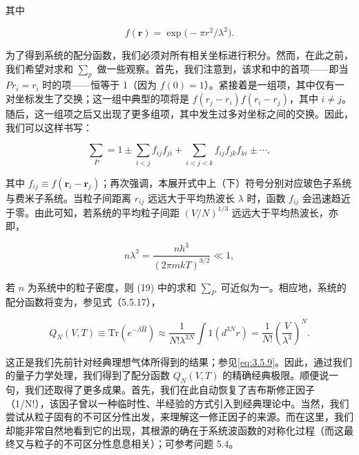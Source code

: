 其中

\begin{equation}\tag{5.4.37}\label{eq:5.4.37}
f ( \boldsymbol { r } ) = \exp \big ( - \pi r ^{2} / \lambda ^{2} \big ) .
\end{equation}

为了得到系统的配分函数，我们必须对所有相关坐标进行积分。然而，在此之前，我们希望对求和 \(\sum_{p}\) 做一些观察。首先，我们注意到，该求和中的首项------即当 \(Pr_{i}=r_{i}\) 时的项------恒等于 1（因为 \(f(0)=1\)）。紧接着是一组项，其中仅有一对坐标发生了交换；这一组中典型的项将是 \(f(r_{j}-r_{i})f(r_{i}-r_{j})\)，其中 \(i\neq j\)。随后，这一组项之后又出现了更多组项，其中发生过多对坐标之间的交换。因此，我们可以这样书写：

\begin{equation}\tag{5.4.38}\label{eq:5.4.38}
\sum _ { P } = 1 \pm \sum _ { i < j } f _ { i j } f _ { j i } + \sum _ { i < j < k } f _ { i j } f _ { j k } f _ { k i } \pm \cdots ,
\end{equation}

其中 \(f_{ij} \equiv f(\boldsymbol{r}_i - \boldsymbol{r}_j)\)；再次强调，本展开式中上（下）符号分别对应玻色子系统与费米子系统。当粒子间距离 \(r_{ij}\) 远远大于平均热波长 \(\lambda\) 时，函数 \(f_{ij}\) 会迅速趋近于零。由此可知，若系统的平均粒子间距 \((V/N)^{1/3}\) 远远大于平均热波长，亦即，

\begin{equation}\tag{5.4.39}\label{eq:5.4.39}
n \lambda ^{3} = \frac { n h ^{3} } { ( 2 \pi m k T ) ^{3 / 2} } \ll 1 ,
\end{equation}

若 \(n\) 为系统中的粒子密度，则 (19) 中的求和 \(\sum_{P}\) 可近似为一。相应地，系统的配分函数将变为，参见式（5.5.17），

\begin{equation}\tag{5.4.40}\label{eq:5.4.40}
Q _ { N } ( V , T ) \equiv \mathrm { T r } \left( e ^{- \beta \hat { H} } \right) \approx \frac { 1 } { N ! \lambda ^{3 N} } \int 1 ( d ^{3 N} r ) = \frac { 1 } { N ! } \left( \frac { V } { \lambda ^{3} } \right) ^{N} .
\end{equation}

这正是我们先前针对经典理想气体所得到的结果；参见\autoref{eq:3.5.9}。因此，通过我们的量子力学处理，我们得到了配分函数 \(Q_{N}(V,T)\) 的精确经典极限。顺便说一句，我们还取得了更多成果。首先，我们在此自动恢复了吉布斯修正因子（1/N!），该因子曾以一种临时性、半经验的方式引入到经典理论中。当然，我们尝试从粒子固有的不可区分性出发，来理解这一修正因子的来源。而在这里，我们却能非常自然地看到它的出现，其根源的确在于系统波函数的对称化过程（而这最终又与粒子的不可区分性息息相关）；可参考问题 5.4。

